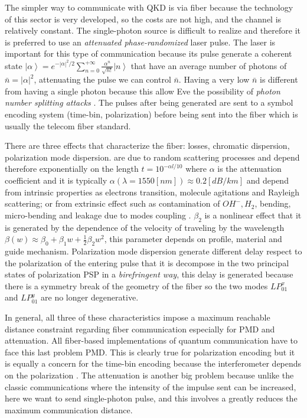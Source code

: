 The simpler way to communicate with QKD is via fiber because the technology of this sector is very developed, so the costs are not high, and the channel is relatively constant. The single-photon source is difficult to realize and therefore it is preferred to use an \textit{attenuated phase-randomized} laser pulse. The laser is important for this type of communication because its pulse generate a coherent state $\left|\alpha\right> = e^{- |\alpha|^2 / 2} \sum_{n=0}^{+\infty} \frac{\alpha^n}{\sqrt{n!}} \left|n\right>$ that have an average number of photons of $\bar{n} = |\alpha|^2$, attenuating the pulse we can control $\bar{n}$. Having a very low $\bar{n}$ is different from having a single photon because this allow Eve the possibility of \textit{photon number splitting attacks} \cite{a24}. The pulses after being generated are sent to a symbol encoding system (time-bin, polarization) before being sent into the fiber which is usually the telecom fiber standard.

There are three effects that characterize the fiber: losses, chromatic dispersion, polarization mode dispersion.  are due to random scattering processes and depend therefore exponentially on the length $t = 10^{-\alpha l / 10}$ where $\alpha$ is the attenuation coefficient and it is typically $\alpha(\lambda = 1550[nm]) \approx 0.2 [dB / km]$ and depend from intrinsic properties as electrons transition, molecule agitations and Rayleigh scattering; or from extrinsic effect such as contamination of $OH^-, H_2$, bending, micro-bending and leakage due to modes coupling .  $\beta_2$ is a nonlinear effect that it is generated by the dependence of the velocity of traveling by the wavelength $\beta(w) \approx \beta_0 + \beta_1 w + \frac{1}{2} \beta_2 w^2$, this parameter depends on profile, material and guide mechanism. Polarization mode dispersion  generate different delay respect to the polarization of the entering pulse that it is decompose in the two principal states of polarization PSP in a \textit{birefringent way}, this delay is generated because there is a symmetry break of the geometry of the fiber so the two modes $LP_{01}^x$ and $LP_{01}^y$ are no longer degenerative.

In general, all three of these characteristics impose a maximum reachable distance constraint regarding fiber communication especially for PMD and attenuation. All fiber-based implementations of quantum communication have to face this last problem PMD. This is clearly true for polarization encoding but it is equally a concern for the time-bin encoding because the interferometer depends on the polarization \cite{a25}. The attenuation is another big problem because unlike the classic communications where the intensity of the impulse sent can be increased, here we want to send single-photon pulse, and this involves a greatly reduces the maximum communication distance.

